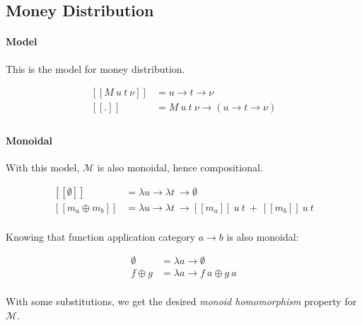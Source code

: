 \subsection{Money Distribution}

\paragraph{Model}

This is the model for money distribution.

\begin{equation}\label{md_model}
    \begin{split}
        [\![M\ u\ t\ \nu]\!] &= u \rightarrow t \rightarrow \nu \\
        [\![.]\!] &= M\ u\ t\ \nu \rightarrow (u \rightarrow t \rightarrow \nu) \\
    \end{split}
\end{equation}

\paragraph{Monoidal}

With this model, $\mathcal{M}$ is also monoidal, hence compositional.

\begin{equation}
    \begin{split}
        [\![\emptyset]\!] &= \lambda u \rightarrow \lambda t\ \rightarrow \emptyset \\
        [\![m_a \oplus m_b]\!] &= \lambda u \rightarrow \lambda t\ \rightarrow
            [\![m_a]\!]\ u\ t\ +\ [\![m_b]\!]\ u\ t \\
    \end{split}
\end{equation}

Knowing that function application category $a \rightarrow b$ is also monoidal:

\begin{equation}
    \begin{split}
        \emptyset &= \lambda a \rightarrow \emptyset \\
        f \oplus g &= \lambda a \rightarrow f\ a \oplus g\ a \\
    \end{split}
\end{equation}

With some substitutions, we get the desired \textit{monoid homomorphism} property for $\mathcal{M}$.


